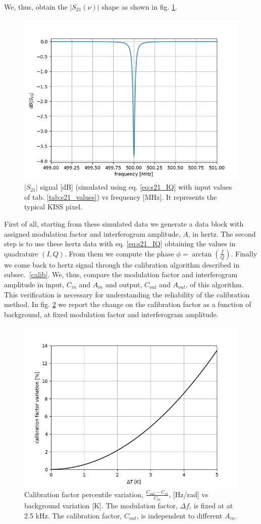 \documentclass[twocolumn,traditabstract]{aa}\\
\begin{document}
\noindent We, thus, obtain the $\left|S_{21}(\nu)\right|$ shape as shown in fig. \ref{fig:s21_simu}.

\begin{figure}[htf]
	\centering
	\includegraphics[width=.5\textwidth]{3.acqui/resonance.png}
	\caption{$\left|S_{21} \right|$ signal [dB] (simulated using eq. \ref{eq:s21_IQ} with input values of tab. \ref{tab:s21_values}) vs frequency [MHz]. It represents the typical KISS pixel. }
	\label{fig:s21_simu}
\end{figure}

First of all, starting from these simulated data we generate a data block with assigned modulation factor and interferogram amplitude, $A$, in hertz. The second step is to use these hertz data with eq. \ref{eq:s21_IQ} obtaining the values in quadrature $(I,Q)$. From them we compute the phase $\phi=\arctan\left(\frac{I}{Q}\right)$. Finally we come back to hertz signal through the calibration algorithm described in subsec.~\ref{calib}. We, thus, compare the modulation factor and interferogram amplitude in input, $C_{in}$ and $A_{in}$ and output, $C_{out}$ and $A_{out}$, of this algorithm. This verification is necessary for understanding the reliability of the calibration method. In fig. \ref{fig:cal_bck} we report the change on the calibration factor as a function of background, at fixed modulation factor and interferogram amplitude.

\begin{figure}[htf]
	\centering
	\includegraphics[width=.5\textwidth]{3.acqui/calibration_factor_variation.png}
	\caption{Calibration factor percentile variation, $\frac{C_{out}-C_{in}}{C_{in}}$, [Hz/rad] vs background variation [K]. The modulation factor, $\Delta f$, is fixed at at 2.5 kHz. The calibration factor, $C_{out}$, is independent to different $A_{in}$.}
	\label{fig:cal_bck}
\end{figure}
\end{document}

